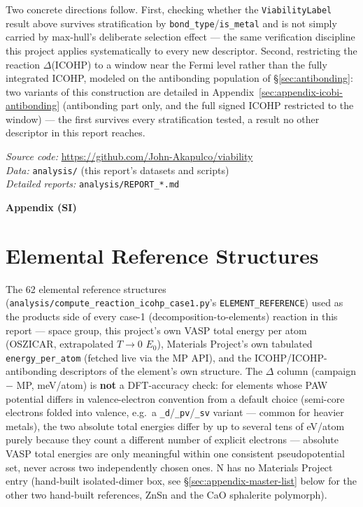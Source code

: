 \documentclass[11pt,a4paper]{article}
\begin{document}
Two concrete directions follow. First, checking whether the
\texttt{ViabilityLabel} result above survives stratification by
\texttt{bond\_type}/\texttt{is\_metal} and is not simply carried by
max-hull's deliberate selection effect --- the same verification
discipline this project applies systematically to every new descriptor.
Second, restricting the reaction $\Delta$(ICOHP) to a window near the
Fermi level rather than the fully integrated ICOHP, modeled on the
antibonding population of \S\ref{sec:antibonding}: two variants of this
construction are detailed in
Appendix~\ref{sec:appendix-icobi-antibonding} (antibonding part only,
and the full signed ICOHP restricted to the window) --- the first
survives every stratification tested, a result no other descriptor in
this report reaches.

\vspace{1cm}
\noindent\textit{Source code:} \url{https://github.com/John-Akapulco/viability} \\
\noindent\textit{Data:} \texttt{analysis/} (this report's datasets and scripts) \\
\noindent\textit{Detailed reports:} \texttt{analysis/REPORT\_*.md}

\appendix
\renewcommand{\thetable}{S\arabic{table}}
\setcounter{table}{0}

\begin{center}
\Large\textbf{Appendix (SI)}
\end{center}
\vspace{0.3cm}

\section{Elemental Reference Structures}
\label{sec:appendix-elements}

The 62 elemental reference structures
(\texttt{analysis/compute\_reaction\_icohp\_case1.py}'s
\texttt{ELEMENT\_REFERENCE}) used as the products side of every case-1
(decomposition-to-elements) reaction in this report --- space group, this
project's own VASP total energy per atom (OSZICAR, extrapolated $T\to0$
$E_0$), Materials Project's own tabulated \texttt{energy\_per\_atom}
(fetched live via the MP API), and the ICOHP/ICOHP-antibonding
descriptors of the element's own structure. The $\Delta$ column
(campaign $-$ MP, meV/atom) is \textbf{not} a DFT-accuracy check: for
elements whose PAW potential differs in valence-electron convention from
a default choice (semi-core electrons folded into valence, e.g.\ a
\texttt{\_d}/\texttt{\_pv}/\texttt{\_sv} variant --- common for heavier
metals), the two absolute total energies differ by up to several tens of
eV/atom purely because they count a different number of explicit
electrons --- absolute VASP total energies are only meaningful within one
consistent pseudopotential set, never across two independently chosen
ones. N has no Materials
Project entry (hand-built isolated-dimer box, see
\S\ref{sec:appendix-master-list} below for the other two hand-built
references, ZnSn and the CaO sphalerite polymorph).
\end{document}
